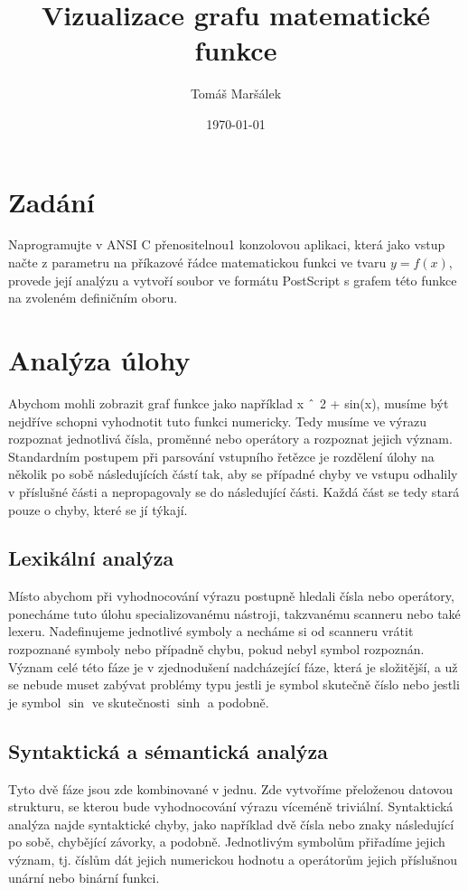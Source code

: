 \documentclass[11pt]{article}
\title{Vizualizace grafu matematické funkce}
\author{Tomáš Maršálek}
\date{\today}
\newcommand\CARET{\mathbin{\char`\^}}
\begin{document}
\maketitle

\section{Zadání}
Naprogramujte v ANSI C přenositelnou1 konzolovou aplikaci, která jako vstup
načte z parametru na příkazové řádce matematickou funkci ve tvaru $y = f(x)$,
provede její analýzu a vytvoří soubor ve formátu PostScript s grafem této
funkce na zvoleném definičním oboru.

\section{Analýza úlohy}
Abychom mohli zobrazit graf funkce jako například x $\CARET$ 2 + sin(x), musíme
být nejdříve schopni vyhodnotit tuto funkci numericky. Tedy musíme ve výrazu
rozpoznat jednotlivá čísla, proměnné nebo operátory a rozpoznat jejich význam.
Standardním postupem při parsování vstupního řetězce je rozdělení úlohy na
několik po sobě následujících částí tak, aby se případné chyby ve vstupu
odhalily v příslušné části a nepropagovaly se do následující části. Každá část
se tedy stará pouze o chyby, které se jí týkají.

\subsection{Lexikální analýza}
Místo abychom při vyhodnocování výrazu postupně hledali čísla nebo operátory,
ponecháme tuto úlohu specializovanému nástroji, takzvanému scanneru nebo také
lexeru.  Nadefinujeme jednotlivé symboly a necháme si od scanneru vrátit
rozpoznané symboly nebo případně chybu, pokud nebyl symbol rozpoznán. Význam
celé této fáze je v zjednodušení nadcházející fáze, která je složitější, a už
se nebude muset zabývat problémy typu jestli je symbol skutečně číslo nebo
jestli je symbol $\sin$ ve skutečnosti $\sinh$ a podobně.

\subsection{Syntaktická a sémantická analýza}
Tyto dvě fáze jsou zde kombinované v jednu. Zde vytvoříme přeloženou datovou
strukturu, se kterou bude vyhodnocování výrazu víceméně triviální. Syntaktická
analýza najde syntaktické chyby, jako například dvě čísla nebo znaky
následující po sobě, chybějící závorky, a podobně. Jednotlivým symbolům přiřadíme jejich význam, tj. číslům dát jejich numerickou hodnotu a operátorům 
jejich příslušnou unární nebo binární funkci. 
\end{document}
